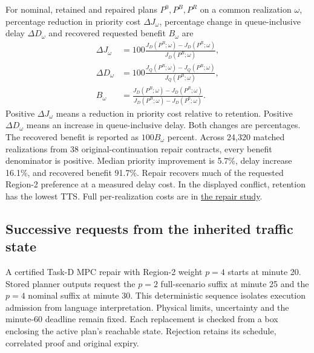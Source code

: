 \documentclass[preprint,12pt]{elsarticle}
\newcommand{\reproductiondetails}[1]{\href{https://github.com/AlienEslami/agentic-perimeter-runtime-certification/blob/main/paper/supporting_materials/REPRODUCING_THE_REDUCED_PAPER.md}{#1}}
\begin{document}
For nominal, retained and repaired plans $P^0,P^B,P^R$ on a common
realization $\omega$, percentage reduction in priority cost $\Delta J_\omega$, percentage change in queue-inclusive delay $\Delta D_\omega$ and
recovered requested benefit $B_\omega$ are
\begin{equation}
\begin{aligned}
\Delta J_\omega&=100\frac{J_D(P^B;\omega)-J_D(P^R;\omega)}{J_D(P^B;\omega)},\\
\Delta D_\omega&=100\frac{J_Q(P^R;\omega)-J_Q(P^B;\omega)}{J_Q(P^B;\omega)},\\
B_\omega&=\frac{J_D(P^B;\omega)-J_D(P^R;\omega)}{J_D(P^B;\omega)-J_D(P^0;\omega)}.
\end{aligned}
\label{eq:benchmark-repair-metrics}
\end{equation}
Positive $\Delta J_\omega$ means a reduction in priority cost relative to retention.
Positive $\Delta D_\omega$ means an increase in queue-inclusive delay. Both changes are percentages. The recovered
benefit is reported as $100B_\omega$ percent.
Across 24,320 matched realizations from 38 original-continuation repair
contracts, every benefit denominator is positive. Median priority
improvement is 5.7\%, delay increase 16.1\%, and recovered benefit 91.7\%.
Repair recovers much of the requested Region-2 preference at a measured
delay cost. In the displayed conflict, retention has the lowest TTS.
Full per-realization costs are in \reproductiondetails{the repair study}.

\subsection{Successive requests from the inherited traffic state}
\label{sec:sequential-handover-results}

A certified Task-D MPC repair with Region-2 weight $p=4$ starts at minute
20. Stored planner outputs request the $p=2$ full-scenario suffix at minute
25 and the $p=4$ nominal suffix at minute 30. This deterministic sequence
isolates execution admission from language interpretation. Physical limits,
uncertainty and the minute-60 deadline remain fixed. Each replacement is
checked from a box enclosing the active plan's reachable state. Rejection
retains its schedule, correlated proof and original expiry.
\end{document}

